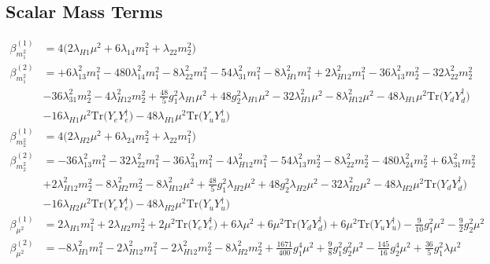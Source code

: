 \subsection{Scalar Mass Terms}
{\allowdisplaybreaks  \begin{align} 
\beta_{m_{1}^2}^{(1)} & =  
4 \Big(2 \lambda_{H1} \mu^2  + 6 \lambda_{14} m_{1}^2  + \lambda_{22} m_{2}^2 \Big)\\ 
\beta_{m_{1}^2}^{(2)} & =  
+6 \lambda_{13}^{2} m_{1}^2 -480 \lambda_{14}^{2} m_{1}^2 -8 \lambda_{22}^{2} m_{1}^2 -54 \lambda_{31}^{2} m_{1}^2 -8 \lambda_{H1}^{2} m_{1}^2 +2 \lambda_{H12}^{2} m_{1}^2 -36 \lambda_{13}^{2} m_{2}^2 -32 \lambda_{22}^{2} m_{2}^2 \nonumber \\ 
 &-36 \lambda_{31}^{2} m_{2}^2 -4 \lambda_{H12}^{2} m_{2}^2 +\frac{48}{5} g_{1}^{2} \lambda_{H1} \mu^2 +48 g_{2}^{2} \lambda_{H1} \mu^2 -32 \lambda_{H1}^{2} \mu^2 -8 \lambda_{H12}^{2} \mu^2 -48 \lambda_{H1} \mu^2 \mbox{Tr}\Big({Y_d  Y_{d}^{\dagger}}\Big) \nonumber \\ 
 &-16 \lambda_{H1} \mu^2 \mbox{Tr}\Big({Y_e  Y_{e}^{\dagger}}\Big) -48 \lambda_{H1} \mu^2 \mbox{Tr}\Big({Y_u  Y_{u}^{\dagger}}\Big) \\ 
\beta_{m_{2}^2}^{(1)} & =  
4 \Big(2 \lambda_{H2} \mu^2  + 6 \lambda_{24} m_{2}^2  + \lambda_{22} m_{1}^2 \Big)\\ 
\beta_{m_{2}^2}^{(2)} & =  
-36 \lambda_{13}^{2} m_{1}^2 -32 \lambda_{22}^{2} m_{1}^2 -36 \lambda_{31}^{2} m_{1}^2 -4 \lambda_{H12}^{2} m_{1}^2 -54 \lambda_{13}^{2} m_{2}^2 -8 \lambda_{22}^{2} m_{2}^2 -480 \lambda_{24}^{2} m_{2}^2 +6 \lambda_{31}^{2} m_{2}^2 \nonumber \\ 
 &+2 \lambda_{H12}^{2} m_{2}^2 -8 \lambda_{H2}^{2} m_{2}^2 -8 \lambda_{H12}^{2} \mu^2 +\frac{48}{5} g_{1}^{2} \lambda_{H2} \mu^2 +48 g_{2}^{2} \lambda_{H2} \mu^2 -32 \lambda_{H2}^{2} \mu^2 -48 \lambda_{H2} \mu^2 \mbox{Tr}\Big({Y_d  Y_{d}^{\dagger}}\Big) \nonumber \\ 
 &-16 \lambda_{H2} \mu^2 \mbox{Tr}\Big({Y_e  Y_{e}^{\dagger}}\Big) -48 \lambda_{H2} \mu^2 \mbox{Tr}\Big({Y_u  Y_{u}^{\dagger}}\Big) \\ 
\beta_{\mu^2}^{(1)} & =  
2 \lambda_{H1} m_{1}^2  + 2 \lambda_{H2} m_{2}^2  + 2 \mu^2 \mbox{Tr}\Big({Y_e  Y_{e}^{\dagger}}\Big)  + 6 \lambda \mu^2  + 6 \mu^2 \mbox{Tr}\Big({Y_d  Y_{d}^{\dagger}}\Big)  + 6 \mu^2 \mbox{Tr}\Big({Y_u  Y_{u}^{\dagger}}\Big)  -\frac{9}{10} g_{1}^{2} \mu^2  -\frac{9}{2} g_{2}^{2} \mu^2 \\ 
\beta_{\mu^2}^{(2)} & =  
-8 \lambda_{H1}^{2} m_{1}^2 -2 \lambda_{H12}^{2} m_{1}^2 -2 \lambda_{H12}^{2} m_{2}^2 -8 \lambda_{H2}^{2} m_{2}^2 +\frac{1671}{400} g_{1}^{4} \mu^2 +\frac{9}{8} g_{1}^{2} g_{2}^{2} \mu^2 -\frac{145}{16} g_{2}^{4} \mu^2 +\frac{36}{5} g_{1}^{2} \lambda \mu^2 \nonumber \\ 

\end{align}}
